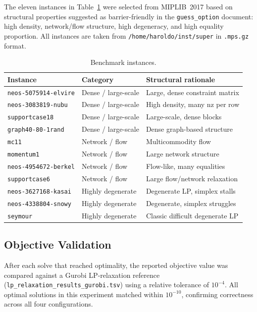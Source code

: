 \documentclass[11pt,a4paper]{article}
\begin{document}
The eleven instances in Table~\ref{tab:instances} were selected from
MIPLIB~2017 based on structural properties suggested as barrier-friendly
in the \texttt{guess\_option} document: high density, network/flow structure,
high degeneracy, and high equality proportion.  All instances are taken from
\texttt{/home/haroldo/inst/super} in \texttt{.mps.gz} format.

\begin{table}[h]
\centering
\caption{Benchmark instances.}
\label{tab:instances}
\begin{tabular}{@{}lll@{}}
\toprule
\textbf{Instance} & \textbf{Category} & \textbf{Structural rationale} \\
\midrule
\texttt{neos-5075914-elvire}  & Dense / large-scale   & Large, dense constraint matrix \\
\texttt{neos-3083819-nubu}    & Dense / large-scale   & High density, many nz per row \\
\texttt{supportcase18}        & Dense / large-scale   & Large-scale, dense blocks \\
\texttt{graph40-80-1rand}     & Dense / large-scale   & Dense graph-based structure \\
\texttt{mc11}                 & Network / flow        & Multicommodity flow \\
\texttt{momentum1}            & Network / flow        & Large network structure \\
\texttt{neos-4954672-berkel}  & Network / flow        & Flow-like, many equalities \\
\texttt{supportcase6}         & Network / flow        & Large flow/network relaxation \\
\texttt{neos-3627168-kasai}   & Highly degenerate     & Degenerate LP, simplex stalls \\
\texttt{neos-4338804-snowy}   & Highly degenerate     & Degenerate, simplex struggles \\
\texttt{seymour}              & Highly degenerate     & Classic difficult degenerate LP \\
\bottomrule
\end{tabular}
\end{table}

\subsection{Objective Validation}

After each solve that reached optimality, the reported objective value was
compared against a Gurobi LP-relaxation reference
(\texttt{lp\_relaxation\_results\_gurobi.tsv}) using a relative tolerance of
$10^{-4}$.  All optimal solutions in this experiment matched within
$10^{-10}$, confirming correctness across all four configurations.
\end{document}
